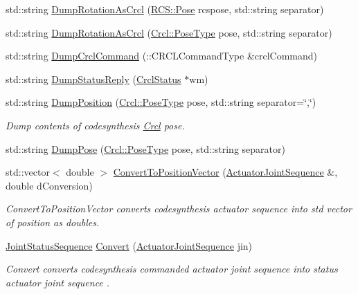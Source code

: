 \begin{DoxyCompactItemize}
\item 
std\-::string \hyperlink{namespaceCrcl_a710c3a8bdd5a36fc1df3996f005544ec}{Dump\-Rotation\-As\-Crcl} (\hyperlink{namespaceRCS_aa07e45d8a50e30064283d2b38087f999}{R\-C\-S\-::\-Pose} rcspose, std\-::string separator)
\item 
std\-::string \hyperlink{namespaceCrcl_a6f1cb883f1831e5f4be05f3d111545fd}{Dump\-Rotation\-As\-Crcl} (\hyperlink{namespaceCrcl_acc6c82b52280f4d0e74b82a92400956e}{Crcl\-::\-Pose\-Type} pose, std\-::string separator)
\item 
std\-::string \hyperlink{namespaceCrcl_a1726015b66be8193fcd10bc157661a3d}{Dump\-Crcl\-Command} (\-::C\-R\-C\-L\-Command\-Type \&crcl\-Command)
\item 
std\-::string \hyperlink{namespaceCrcl_af7bfef1ba7b0d1fa2ea0033ef391d254}{Dump\-Status\-Reply} (\hyperlink{structCrcl_1_1CrclStatus}{Crcl\-Status} $\ast$wm)
\item 
std\-::string \hyperlink{namespaceCrcl_a7ffbb8bbe0b97bcd6fc145b52eba1c6e}{Dump\-Position} (\hyperlink{namespaceCrcl_acc6c82b52280f4d0e74b82a92400956e}{Crcl\-::\-Pose\-Type} pose, std\-::string separator=\char`\"{},\char`\"{})
\begin{DoxyCompactList}\small\item\em Dump contents of codesynthesis \hyperlink{namespaceCrcl}{Crcl} pose. \end{DoxyCompactList}\item 
std\-::string \hyperlink{namespaceCrcl_a666314177998417d741895bb491783bd}{Dump\-Pose} (\hyperlink{namespaceCrcl_acc6c82b52280f4d0e74b82a92400956e}{Crcl\-::\-Pose\-Type} pose, std\-::string separator)
\item 
std\-::vector$<$ double $>$ \hyperlink{namespaceCrcl_af6bec848a13c03669ca8920795c5d3ad}{Convert\-To\-Position\-Vector} (\hyperlink{namespaceCrcl_af084766e8e2d38a135cc67ef54d9904d}{Actuator\-Joint\-Sequence} \&, double d\-Conversion)
\begin{DoxyCompactList}\small\item\em Convert\-To\-Position\-Vector converts codesynthesis actuator sequence into std vector of position as doubles. \end{DoxyCompactList}\item 
\hyperlink{namespaceCrcl_a8e2d423195eeffb85b45b63f595f2825}{Joint\-Status\-Sequence} \hyperlink{namespaceCrcl_a329b70844c080b1a81c89989b58ffbd5}{Convert} (\hyperlink{namespaceCrcl_af084766e8e2d38a135cc67ef54d9904d}{Actuator\-Joint\-Sequence} jin)
\begin{DoxyCompactList}\small\item\em Convert converts codesynthesis commanded actuator joint sequence into status actuator joint sequence . \end{DoxyCompactList}\item 

\end{DoxyCompactItemize}

